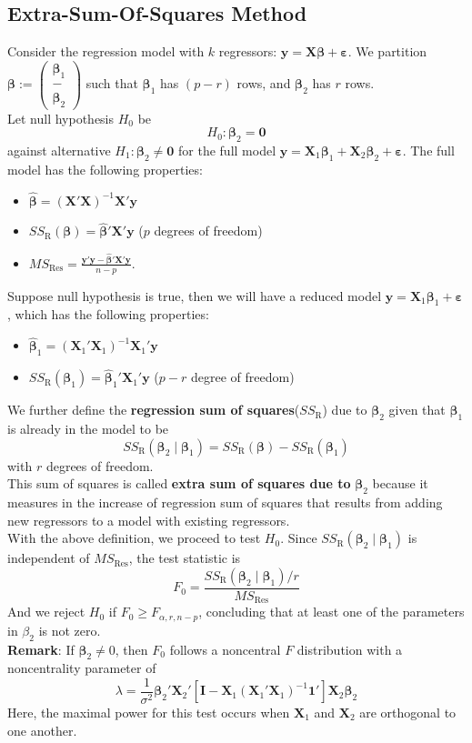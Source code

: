 \documentclass[11pt]{article}
\theoremstyle{definition}
\begin{document}
\subsection{Extra-Sum-Of-Squares Method}
Consider the regression model with $k$ regressors: $\bm{y}=\bm{X\beta}+\bm{\varepsilon}$. We partition $\bm{\beta}:=\begin{pmatrix}\bm{\beta}_1\\-\\\bm{\beta}_2\end{pmatrix}$ such that $\bm{\beta}_1$ has $(p-r)$ rows, and $\bm{\beta}_2$ has $r$ rows.\\
Let null hypothesis $H_0$ be
\[
H_0:\bm{\beta}_2=\bm{0}
\]
against alternative $H_1:\bm{\beta}_2\neq \bm{0}$ for the full model $\bm{y}=\bm{X}_1\bm{\beta}_1+\bm{X}_2\bm{\beta}_2+\bm{\varepsilon}$. The full model has the following properties:
\begin{itemize}
  \item $\hat{\bm{\beta}}=(\bm{X}'\bm{X})^{-1}\bm{X}'\bm{y}$
  \item $SS_\text{R}(\bm{\beta}) = \hat{\bm{\beta}}'\bm{X}'\bm{y}$ ($p$ degrees of freedom)
  \item $MS_\text{Res}=\frac{\bm{y}'\bm{y}-\hat{\bm{\beta}}'\bm{X}'\bm{y}}{n-p}$.
\end{itemize}
Suppose null hypothesis is true, then we will have a reduced model $\bm{y}=\bm{X}_1\bm{\beta}_1+\bm{\varepsilon}$, which has the following properties:
\begin{itemize}
  \item $\hat{\bm{\beta}}_1=(\bm{X}_1'\bm{X}_1)^{-1}\bm{X}_1'\bm{y}$
  \item $SS_\text{R}(\bm{\beta}_1)=\hat{\bm{\beta}}_1'\bm{X}_1'\bm{y}$ ($p-r$ degree of freedom)
\end{itemize}
We further define the \textbf{regression sum of squares}($SS_\text{R}$) due to $\bm{\beta}_2$ given that $\bm{\beta}_1$ is already in the model to be
\[
SS_\text{R}(\bm{\beta}_2\mid\bm{\beta}_1)=SS_\text{R}(\bm{\beta})-SS_\text{R}(\bm{\beta}_1)
\]
with $r$ degrees of freedom.\\
This sum of squares is called \textbf{extra sum of squares due to} $\bm{\beta}_2$ because it measures in the increase of regression sum of squares that results from adding new regressors to a model with existing regressors.\\
With the above definition, we proceed to test $H_0$. Since $SS_\text{R}(\bm{\beta}_2\mid \bm{\beta}_1)$ is independent of $MS_\text{Res}$, the test statistic is
\[
F_0=\frac{SS_\text{R}(\bm{\beta}_2\mid \bm{\beta}_1)/r}{MS_\text{Res}}
\]
And we reject $H_0$ if $F_0\geq F_{\alpha,r,n-p}$, concluding that at least one of the parameters in $\beta_2$ is not zero.\\
\textbf{Remark}: If $\bm{\beta}_2\neq 0$, then $F_0$ follows a noncentral $F$ distribution with a noncentrality parameter of 
\[
\lambda = \frac{1}{\sigma^2}\bm{\beta}_2'\bm{X}_2'[\bm{I}-\bm{X}_1(\bm{X}_1'\bm{X}_1)^{-1}\bm{1}']\bm{X}_2\bm{\beta}_2
\]
Here, the maximal power for this test occurs when $\bm{X}_1$ and $\bm{X}_2$ are orthogonal to one another.\\
\end{document}
